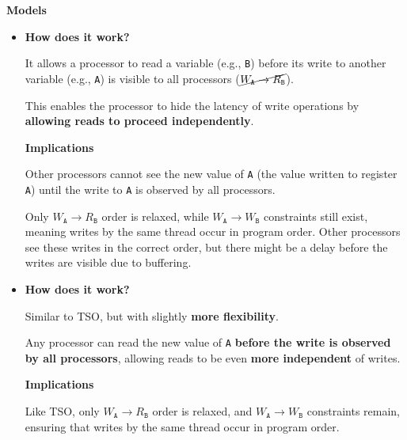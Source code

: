 \newpage

\begin{flushleft}
    \textcolor{Green3}{ \textbf{Models}}
\end{flushleft}
\begin{itemize}
    \item {}
    \begin{flushleft}
        \textcolor{Green3}{ \textbf{How does it work?}}
    \end{flushleft}
    It allows a processor to read a variable (e.g., \texttt{B}) before its write to another variable (e.g., \texttt{A}) is visible to all processors ($\cancel{W_{\texttt{A}} \rightarrow R_{\texttt{B}}}$).

    This enables the processor to hide the latency of write operations by \textbf{allowing reads to proceed independently}.

    \begin{flushleft}
        \textcolor{Red2}{ \textbf{Implications}}
    \end{flushleft}
    Other processors cannot see the new value of \texttt{A} (the value written to register \texttt{A}) until the write to \texttt{A} is observed by all processors.

    Only $W_{\texttt{A}} \rightarrow R_{\texttt{B}}$ order is relaxed, while $W_{\texttt{A}} \rightarrow W_{\texttt{B}}$ constraints still exist, meaning writes by the same thread occur in program order. Other processors see these writes in the correct order, but there might be a delay before the writes are visible due to buffering.

    \item {}
    \begin{flushleft}
        \textcolor{Green3}{ \textbf{How does it work?}}
    \end{flushleft}
    Similar to TSO, but with slightly \textbf{more flexibility}.

    Any processor can read the new value of \texttt{A} \textbf{before the write is observed by all processors}, allowing reads to be even \textbf{more independent} of writes.

    \begin{flushleft}
        \textcolor{Red2}{ \textbf{Implications}}
    \end{flushleft}
    Like TSO, only $W_{\texttt{A}} \rightarrow R_{\texttt{B}}$ order is relaxed, and $W_{\texttt{A}} \rightarrow W_{\texttt{B}}$ constraints remain, ensuring that writes by the same thread occur in program order.
\end{itemize}


